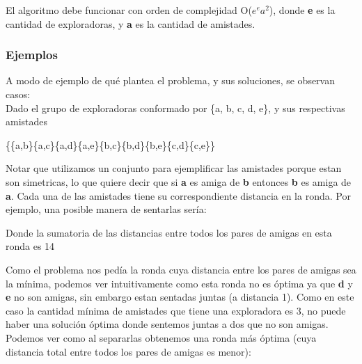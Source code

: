 \documentclass[11pt]{article}
\begin{document}
El algoritmo debe funcionar con orden de complejidad O($e^{e}  a^{2}$), donde \textbf{e} es la cantidad de exploradoras, y \textbf{a} es la cantidad de amistades.

\subsubsection{Ejemplos}

A modo de ejemplo de qué plantea el problema, y sus soluciones, se observan casos:\\ 

Dado el grupo de exploradoras conformado por \{a, b, c, d, e\}, y sus respectivas amistades 

\begin{center}
\{\{a,b\}\{a,c\}\{a,d\}\{a,e\}\{b,c\}\{b,d\}\{b,e\}\{c,d\}\{c,e\}\}
\end{center}

Notar que utilizamos un conjunto para ejemplificar las amistades porque estan son simetricas, lo que quiere
decir que si \textbf{a} es amiga de \textbf{b} entonces \textbf{b} es amiga de \textbf{a}. Cada una de las
amistades tiene su correspondiente distancia en la ronda. Por ejemplo, una posible manera de sentarlas sería:

\begin{figure}[H]
\begin{center}
\end{center}
\end{figure}

Donde la sumatoria de las distancias entre todos los pares de amigas en esta ronda es 14

Como el problema nos pedía la ronda cuya distancia entre los pares de amigas sea la mínima, podemos 
ver intuitivamente como esta ronda no es óptima ya que \textbf{d} y \textbf{e} no son amigas, sin embargo
estan sentadas juntas (a distancia 1). Como en este caso la cantidad mínima de amistades que tiene
una exploradora es 3, no puede haber una solución óptima donde sentemos juntas a dos que no son amigas.
Podemos ver como al separarlas obtenemos una ronda más óptima (cuya distancia total entre todos los
pares de amigas es menor):
\end{document}
